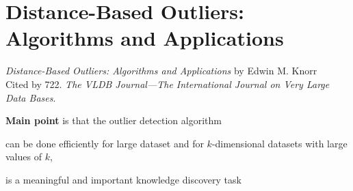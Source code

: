 \section{Distance-Based Outliers: Algorithms and Applications}
\label{ch:knorr00}

\textit{Distance-Based Outliers: Algorithms and Applications} by Edwin M. Knorr \\
Cited by 722. \textit{The VLDB Journal—The International Journal on Very Large Data Bases}.
\newline

\textbf{Main point} is that the outlier detection algorithm \begin{inparaenum}
\item can be done efficiently for large dataset and for $k$-dimensional datasets with large values of $k$, 
\item is a meaningful and important knowledge discovery task
\end{inparaenum}

